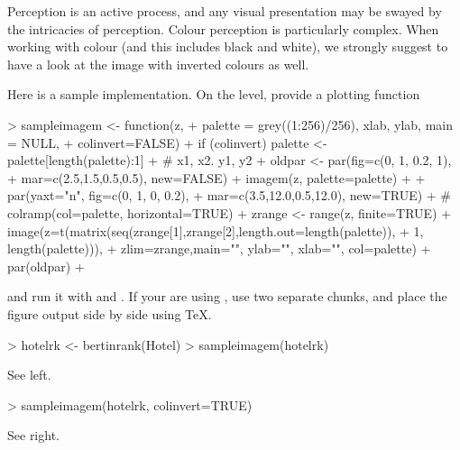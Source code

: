 \documentclass[nogin, dvips,12pt,a4paper,twoside]{amsart}
\begin{document}
Perception is an active process, and any visual presentation may be swayed by the intricacies of perception. Colour perception is particularly complex. When working with colour (and this includes black and white), we strongly suggest to have a look at the image with inverted colours as well.

Here is a sample implementation. On the \R{} level, provide a plotting function 


\begin{Schunk}
\begin{Sinput}
> sampleimagem <- function(z, 
+ 	palette = grey((1:256)/256), xlab, ylab, main = NULL, 
+ 	colinvert=FALSE){
+ 	if (colinvert) palette <- palette[length(palette):1]
+ 	# x1, x2. y1, y2
+ 	oldpar <- par(fig=c(0, 1, 0.2, 1), 
+ 		mar=c(2.5,1.5,0.5,0.5), new=FALSE)
+ 	imagem(z, palette=palette)
+ 	
+ 	par(yaxt="n", fig=c(0, 1, 0, 0.2), 
+ 		mar=c(3.5,12.0,0.5,12.0), new=TRUE)
+ #	colramp(col=palette, horizontal=TRUE)
+ 	zrange <- range(z, finite=TRUE)
+ 	image(z=t(matrix(seq(zrange[1],zrange[2],length.out=length(palette)), 
+ 		1, length(palette))), 
+ 		zlim=zrange,main="", ylab="", xlab="", col=palette)
+ 	par(oldpar)
+ }
\end{Sinput}
\end{Schunk}
and run it with  and   .
If your are using , use two separate chunks, and place the figure output side by side using \TeX.
\begin{Schunk}
\begin{Sinput}
> hotelrk <- bertinrank(Hotel)
> sampleimagem(hotelrk)
\end{Sinput}
\end{Schunk}
See   left.

\begin{Schunk}
\begin{Sinput}
> sampleimagem(hotelrk, colinvert=TRUE)
\end{Sinput}
\end{Schunk}
See   right.
\end{document}
